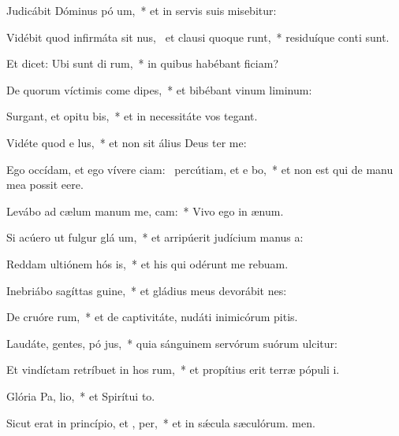 \item Judicábit Dóminus pó um,~* et in servis suis misebitur:
\item Vidébit quod infirmáta sit nus,~\pscross{} et clausi quoque runt,~* residuíque conti sunt.
\item Et dicet: Ubi sunt di rum,~* in quibus habébant ficiam?
\item De quorum víctimis come dipes,~* et bibébant vinum liminum:
\item Surgant, et opitu bis,~* et in necessitáte vos tegant.
\item Vidéte quod e  lus,~* et non sit álius Deus ter me:
\item Ego occídam, et ego vívere ciam:~\pscross{} percútiam, et e bo,~* et non est qui de manu mea possit eere.
\item Levábo ad cælum manum me,  cam:~* Vivo ego in ænum.
\item Si acúero ut fulgur glá um,~* et arripúerit judícium manus a:
\item Reddam ultiónem hós is,~* et his qui odérunt me rebuam.
\item Inebriábo sagíttas  guine,~* et gládius meus devorábit nes:
\item De cruóre rum,~* et de captivitáte, nudáti inimicórum pitis.
\item Laudáte, gentes, pó jus,~* quia sánguinem servórum suórum ulcitur:
\item Et vindíctam retríbuet in hos rum,~* et propítius erit terræ pópuli i.
\item \singlecolsep
\item Glória Pa,  lio,~* et Spirítui to.
\item Sicut erat in princípio, et ,  per,~* et in sǽcula sæculórum. men.


